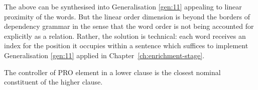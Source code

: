     The above can be synthesised into Generalisation \ref{gen:11} appealing to linear proximity of the words. But the linear order dimension is beyond the borders of dependency grammar in the sense that the word order is not being accounted for explicitly as a relation. Rather, the solution is technical: each word receives an index for the position it occupies within a sentence which suffices to implement Generalisation \ref{gen:11} applied in \mbox{Chapter \ref{ch:enrichment-stage}}.
    
    \begin{generalization}\label{gen:11}
    	The controller of PRO element in a lower clause is the closest nominal constituent of the higher clause.
    \end{generalization}

